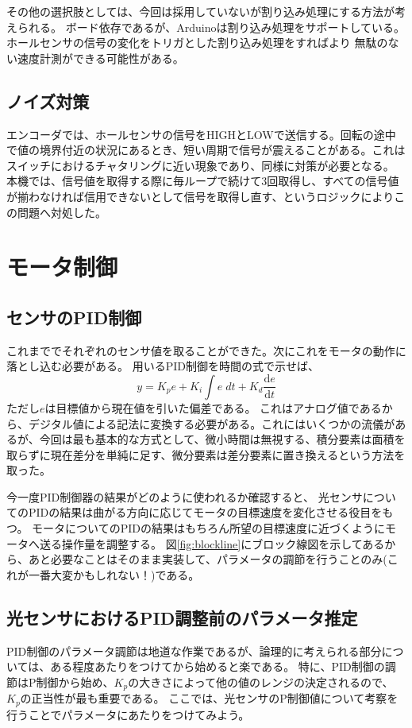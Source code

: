 \documentclass{ltjsreport}
\begin{document}
その他の選択肢としては、今回は採用していないが割り込み処理にする方法が考えられる。
ボード依存であるが、Arduinoは割り込み処理をサポートしている。ホールセンサの信号の変化をトリガとした割り込み処理をすればより
無駄のない速度計測ができる可能性がある。
\subsection{ノイズ対策}
エンコーダでは、ホールセンサの信号をHIGHとLOWで送信する。回転の途中で値の境界付近の状況にあるとき、短い周期で信号が震えることがある。これはスイッチにおけるチャタリングに近い現象であり、同様に対策が必要となる。
本機では、信号値を取得する際に毎ループで続けて3回取得し、すべての信号値が揃わなければ信用できないとして信号を取得し直す、というロジックによりこの問題へ対処した。



\section{モータ制御}


\subsection{センサのPID制御}\label{sec:SensorIntegration}
これまででそれぞれのセンサ値を取ることができた。次にこれをモータの動作に落とし込む必要がある。
用いるPID制御を時間の式で示せば、
\[
  y = K_p e + K_i \int e \; dt + K_d  \frac{\mathrm{d}e}{\mathrm{d}t}
\]
ただし$e$は目標値から現在値を引いた偏差である。
これはアナログ値であるから、デジタル値による記法に変換する必要がある。これにはいくつかの流儀があるが、今回は最も基本的な方式として、微小時間は無視する、積分要素は面積を取らずに現在差分を単純に足す、微分要素は差分要素に置き換えるという方法を取った。

今一度PID制御器の結果がどのように使われるか確認すると、
光センサについてのPIDの結果は曲がる方向に応じてモータの目標速度を変化させる役目をもつ。
モータについてのPIDの結果はもちろん所望の目標速度に近づくようにモータへ送る操作量を調整する。
図\ref{fig:blockline}にブロック線図を示してあるから、あと必要なことはそのまま実装して、パラメータの調節を行うことのみ(これが一番大変かもしれない！)である。

\subsection{光センサにおけるPID調整前のパラメータ推定}\label{sec:PIDestimate}
PID制御のパラメータ調節は地道な作業であるが、論理的に考えられる部分については、ある程度あたりをつけてから始めると楽である。
特に、PID制御の調節はP制御から始め、$K_p$の大きさによって他の値のレンジの決定されるので、$K_p$の正当性が最も重要である。
ここでは、光センサのP制御値について考察を行うことでパラメータにあたりをつけてみよう。
\end{document}
